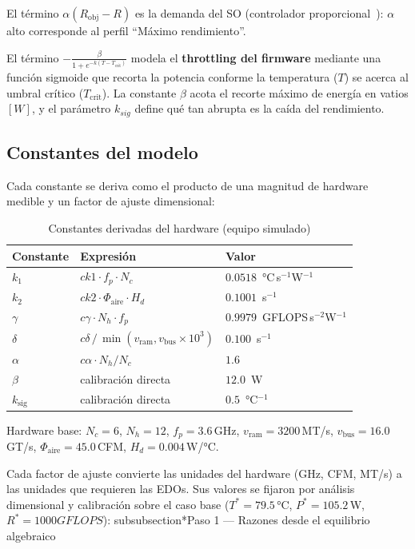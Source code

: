 \documentclass[10pt, twocolumn]{article}
\begin{document}
El término $\alpha(R_\text{obj}-R)$ es la demanda del SO (controlador
proporcional~\cite{ogata}): $\alpha$ alto corresponde al perfil
``Máximo rendimiento''. ~\cite{brooks,nocedal}

El término \(-\frac{\beta}{1+e^{-k(T-T_{\text{crit}})}}\) modela el \textbf{throttling del firmware} mediante una función sigmoide que recorta la potencia conforme la temperatura (\(T\)) se acerca al umbral crítico (\(T_{\text{crit}}\)). La constante \(\beta\) acota el recorte máximo de energía en vatios \([W]\), y el parámetro \(k_{sig}\) define qué tan abrupta es la caída del rendimiento.

\subsection{Constantes del modelo}

Cada constante se deriva como el producto de una magnitud de hardware
medible y un factor de ajuste dimensional:

\begin{table}[H]
\centering
\caption{Constantes derivadas del hardware (equipo simulado)}
\label{tab:constantes}
\small
\begin{tabular}{@{}lll@{}}
\toprule
Constante & Expresión & Valor \\
\midrule
$k_1$ & $ck1 \cdot f_p \cdot N_c$               & $0.0518$~°C\,s$^{-1}$W$^{-1}$ \\
$k_2$ & $ck2\cdot \Phi_{\text{aire}} \cdot H_d$  & $0.1001$~s$^{-1}$ \\
$\gamma$ & $c\gamma \cdot N_h \cdot f_p$              & $0.9979$~GFLOPS\,s$^{-2}$W$^{-1}$ \\
$\delta$ & $c\delta \,/\,\min(v_\text{ram},v_\text{bus}{\times}10^3)$ & $0.100$~s$^{-1}$ \\
$\alpha$ & $c\alpha \cdot N_h/N_c$                      & $1.6$ \\
$\beta$  & calibración directa                     & $12.0$~W \\
$k_{\text{sig}}$ & calibración directa             & $0.5$~°C$^{-1}$ \\
\bottomrule
\end{tabular}
\end{table}

\noindent Hardware base: $N_c=6$, $N_h=12$, $f_p=3.6$\,GHz,
$v_\text{ram}=3200$\,MT/s, $v_\text{bus}=16.0$\,GT/s,
$\Phi_\text{aire}=45.0$\,CFM, $H_d=0.004$\,W/°C.

Cada factor de ajuste convierte las unidades del hardware (GHz, CFM, MT/s)
a las unidades que requieren las EDOs. Sus valores se fijaron por análisis
dimensional y calibración sobre el caso base ($T^* = 79.5$\,°C, $P^* = 105.2$\,W, $R^* = 1000 GFLOPS$):
subsubsection*{Paso 1 — Razones desde el equilibrio algebraico}
 
\end{document}
